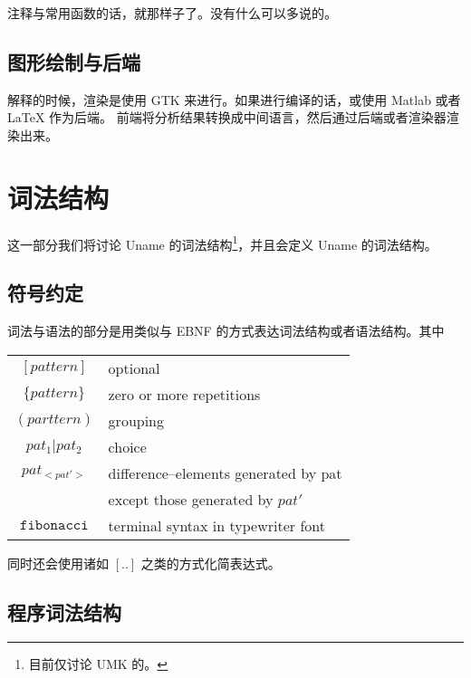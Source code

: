 \documentclass{ctexart}
\begin{document}
注释与常用函数的话，就那样子了。没有什么可以多说的。

\subsection{图形绘制与后端}
\label{sec:intro:drawNbackend}

解释的时候，渲染是使用 GTK 来进行。如果进行编译的话，或使用 Matlab 或者 LaTeX 作为后端。
前端将分析结果转换成中间语言，然后通过后端或者渲染器渲染出来。

\section{词法结构}
\label{sec:lexicalStructure}

这一部分我们将讨论 Uname 的词法结构\footnote{目前仅讨论 UMK 的。}，并且会定义 Uname 的词法结构。

\subsection{符号约定}
\label{sec:lex:nc}

词法与语法的部分是用类似与 EBNF 的方式表达词法结构或者语法结构。其中
\begin{center}
\begin{tabular}{cl}
    $[pattern]$ & optional \\ 
    $\{pattern\}$ & zero or more repetitions \\ 
    $(parttern)$ & grouping\\
    $pat_1|pat_2$ &  choice \\
    $pat_{<pat'>}$ & difference--elements generated by pat\\
     & except those generated by $pat'$ \\
    $\mathtt{fibonacci}$ & terminal syntax in typewriter font
\end{tabular} 
\end{center}

同时还会使用诸如 $[..]$ 之类的方式化简表达式。

\subsection{程序词法结构}
\label{sec:lex:lps}
\end{document}
